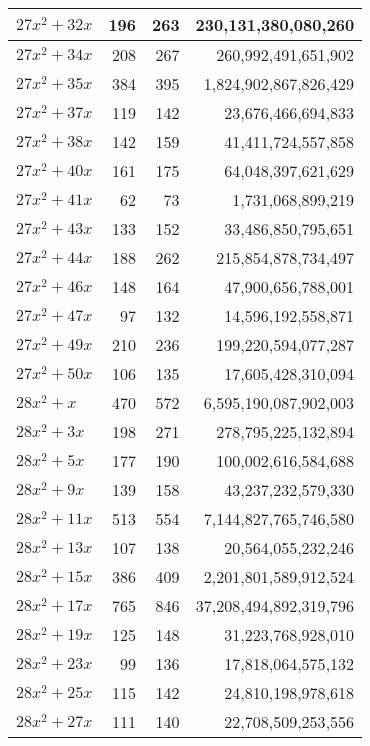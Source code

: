 \documentclass[a4paper]{amsproc}
\theoremstyle{plain}
\theoremstyle{named}
\begin{document}
\begin{longtable}{ | l | r | r | r | }
$27x^2 + 32x$ & 196 & 263 & 230{,}131{,}380{,}080{,}260 \\ \hline
$27x^2 + 34x$ & 208 & 267 & 260{,}992{,}491{,}651{,}902 \\ \hline
$27x^2 + 35x$ & 384 & 395 & 1{,}824{,}902{,}867{,}826{,}429 \\ \hline
$27x^2 + 37x$ & 119 & 142 & 23{,}676{,}466{,}694{,}833 \\ \hline
$27x^2 + 38x$ & 142 & 159 & 41{,}411{,}724{,}557{,}858 \\ \hline
$27x^2 + 40x$ & 161 & 175 & 64{,}048{,}397{,}621{,}629 \\ \hline
$27x^2 + 41x$ & 62 & 73 & 1{,}731{,}068{,}899{,}219 \\ \hline
$27x^2 + 43x$ & 133 & 152 & 33{,}486{,}850{,}795{,}651 \\ \hline
$27x^2 + 44x$ & 188 & 262 & 215{,}854{,}878{,}734{,}497 \\ \hline
$27x^2 + 46x$ & 148 & 164 & 47{,}900{,}656{,}788{,}001 \\ \hline
$27x^2 + 47x$ & 97 & 132 & 14{,}596{,}192{,}558{,}871 \\ \hline
$27x^2 + 49x$ & 210 & 236 & 199{,}220{,}594{,}077{,}287 \\ \hline
$27x^2 + 50x$ & 106 & 135 & 17{,}605{,}428{,}310{,}094 \\ \hline
$28x^2 + x$ & 470 & 572 & 6{,}595{,}190{,}087{,}902{,}003 \\ \hline
$28x^2 + 3x$ & 198 & 271 & 278{,}795{,}225{,}132{,}894 \\ \hline
$28x^2 + 5x$ & 177 & 190 & 100{,}002{,}616{,}584{,}688 \\ \hline
$28x^2 + 9x$ & 139 & 158 & 43{,}237{,}232{,}579{,}330 \\ \hline
$28x^2 + 11x$ & 513 & 554 & 7{,}144{,}827{,}765{,}746{,}580 \\ \hline
$28x^2 + 13x$ & 107 & 138 & 20{,}564{,}055{,}232{,}246 \\ \hline
$28x^2 + 15x$ & 386 & 409 & 2{,}201{,}801{,}589{,}912{,}524 \\ \hline
$28x^2 + 17x$ & 765 & 846 & 37{,}208{,}494{,}892{,}319{,}796 \\ \hline
$28x^2 + 19x$ & 125 & 148 & 31{,}223{,}768{,}928{,}010 \\ \hline
$28x^2 + 23x$ & 99 & 136 & 17{,}818{,}064{,}575{,}132 \\ \hline
$28x^2 + 25x$ & 115 & 142 & 24{,}810{,}198{,}978{,}618 \\ \hline
$28x^2 + 27x$ & 111 & 140 & 22{,}708{,}509{,}253{,}556 \\ \hline

\end{longtable}
\end{document}
